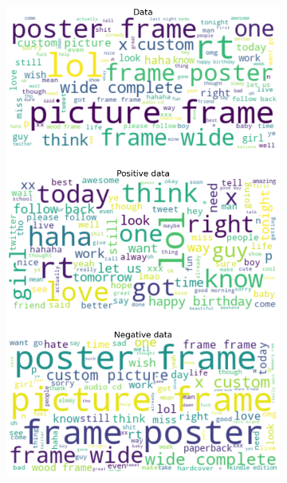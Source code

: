 \documentclass{article}
\begin{document}
\begin{itemize}
\begin{figure}[H]
\begin{subfigure}[b]{0.24\textwidth}
      \includegraphics[width=\textwidth]{chapter-06/section-01-01/06/visualization/3/wordcloud.png}
    \end{subfigure}
    \begin{subfigure}[b]{0.24\textwidth}
      \centering

\end{subfigure}
\end{figure}
\end{itemize}
\end{document}
